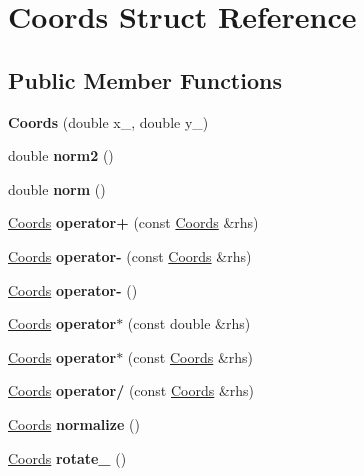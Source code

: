 \hypertarget{struct_coords}{}\section{Coords Struct Reference}
\label{struct_coords}
\subsection*{Public Member Functions}
\begin{DoxyCompactItemize}
\item 
\mbox{\label{struct_coords_a2711e0a680d31f9ba19baaea025897d8}} 
{\bfseries Coords} (double x\+\_\+, double y\+\_\+)
\item 
\mbox{\label{struct_coords_a1ea0e81134f3d690bd448d8cf004993f}} 
double {\bfseries norm2} ()
\item 
\mbox{\label{struct_coords_a2d62e940e7ed4cb05a24d049170b9aa9}} 
double {\bfseries norm} ()
\item 
\mbox{\label{struct_coords_ac944cc5d385b4d27737884bded760405}} 
\mbox{\hyperlink{struct_coords}{Coords}} {\bfseries operator+} (const \mbox{\hyperlink{struct_coords}{Coords}} \&rhs)
\item 
\mbox{\label{struct_coords_a26ea503389f21fbc5d32a6163000d778}} 
\mbox{\hyperlink{struct_coords}{Coords}} {\bfseries operator-\/} (const \mbox{\hyperlink{struct_coords}{Coords}} \&rhs)
\item 
\mbox{\label{struct_coords_a00802f49f80579898e20344ef0e352a2}} 
\mbox{\hyperlink{struct_coords}{Coords}} {\bfseries operator-\/} ()
\item 
\mbox{\label{struct_coords_ace147b80eedcc1cd7867d76bf6a075f5}} 
\mbox{\hyperlink{struct_coords}{Coords}} {\bfseries operator$\ast$} (const double \&rhs)
\item 
\mbox{\label{struct_coords_a40ca135b6dbb4ecbfbed263fd58d12a2}} 
\mbox{\hyperlink{struct_coords}{Coords}} {\bfseries operator$\ast$} (const \mbox{\hyperlink{struct_coords}{Coords}} \&rhs)
\item 
\mbox{\label{struct_coords_ad44e0635a9ef86ab5f655901e1d00d8c}} 
\mbox{\hyperlink{struct_coords}{Coords}} {\bfseries operator/} (const \mbox{\hyperlink{struct_coords}{Coords}} \&rhs)
\item 
\mbox{\label{struct_coords_a5cb214fa037c0e331feab38a578557e5}} 
\mbox{\hyperlink{struct_coords}{Coords}} {\bfseries normalize} ()
\item 
\mbox{\label{struct_coords_a2ebd98fed71466a261f524a69b2edb49}} 
\mbox{\hyperlink{struct_coords}{Coords}} {\bfseries rotate\+\_} ()
\end{DoxyCompactItemize}
